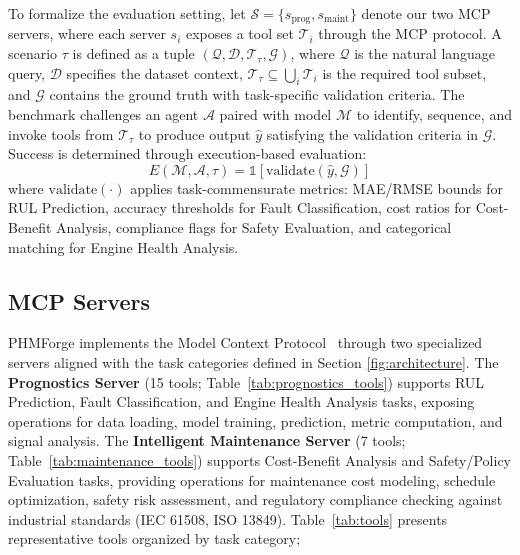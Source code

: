 \documentclass[sigconf, screen, nonacm]{acmart}
\begin{document}
  To formalize the evaluation setting, let $\mathcal{S} = \{s_{\text{prog}},               
  s_{\text{maint}}\}$                                                                      
  denote our two MCP servers, where each server $s_i$ exposes a tool set $\mathcal{T}_i$   
  through the MCP protocol. A scenario $\tau$ is defined as a tuple $(\mathcal{Q},         
  \mathcal{D},                                                                             
  \mathcal{T}_{\tau}, \mathcal{G})$, where $\mathcal{Q}$ is the natural language query,    
  $\mathcal{D}$ specifies the dataset context, $\mathcal{T}_{\tau} \subseteq \bigcup_i     
  \mathcal{T}_i$ is the required tool subset, and $\mathcal{G}$ contains the ground truth  
  with task-specific validation criteria. The benchmark challenges an agent $\mathcal{A}$  
  paired with model $\mathcal{M}$ to identify, sequence, and invoke tools from             
  $\mathcal{T}_{\tau}$ to produce output $\hat{y}$ satisfying the validation criteria in   
  $\mathcal{G}$. Success is determined through execution-based evaluation:                 
  \begin{equation}                                                                         
      E(\mathcal{M}, \mathcal{A}, \tau) = \mathbb{1}[\text{validate}(\hat{y}, \mathcal{G})]
  \end{equation}                                                                           
  where $\text{validate}(\cdot)$ applies task-commensurate metrics: MAE/RMSE bounds for RUL 
  Prediction, accuracy thresholds for Fault Classification, cost ratios for Cost-Benefit   
  Analysis, compliance flags for Safety Evaluation, and categorical matching for Engine    
  Health Analysis.                                                                              
\subsection{MCP Servers}                                          
  PHMForge implements the Model Context Protocol~\cite{wang2025mcpbenchbenchmarkingtoolusingllm} through two specialized    
  servers aligned with the task categories defined in Section \ref{fig:architecture}.   
  The \textbf{Prognostics Server} (15 tools; Table~\ref{tab:prognostics_tools}) supports RUL Prediction, Fault Classification,
  and Engine Health Analysis tasks, exposing operations for data loading, model training,
  prediction, metric computation, and signal analysis. The \textbf{Intelligent Maintenance
  Server} (7 tools; Table~\ref{tab:maintenance_tools}) supports Cost-Benefit Analysis and Safety/Policy Evaluation tasks,    
  providing operations for maintenance cost modeling, schedule optimization, safety risk   
  assessment, and regulatory compliance checking against industrial standards (IEC 61508,  
  ISO 13849). Table~\ref{tab:tools} presents representative tools organized by task        
  category;
\end{document}
